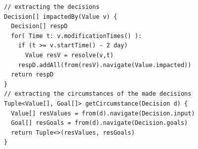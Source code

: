 \begin{lstlisting}[style=customc,caption=Get the goals used by the adaptation process from executed actions, label=code:actions-to-goals,basicstyle=\scriptsize]
// extracting the decisions
Decision[] impactedBy(Value v) {
  Decision[] respD
  for( Time t: v.modificationTimes() ):
    if (t >= v.startTime() - 2 day)
      Value resV = resolve(v,t)
    respD.addAll(from(resV).navigate(Value.impacted))
  return respD
}
// extracting the circumstances of the made decisions
Tuple<Value[], Goal[]> getCircumstance(Decision d) {
  Value[] resValues = from(d).navigate(Decision.input)
  Goal[] resGoals = from(d).navigate(Decision.goals)      
  return Tuple<>(resValues, resGoals)
} 
\end{lstlisting}

%      

